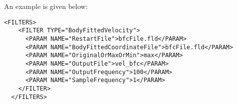 An example is given below:

\begin{lstlisting}[style=XMLStyle]
  <FILTERS>
    <FILTER TYPE="BodyFittedVelocity">
      <PARAM NAME="RestartFile">bfcFile.fld</PARAM>
      <PARAM NAME="BodyFittedCoordinateFile">bfcFile.fld</PARAM>
      <PARAM NAME="OriginalOrMaxOrMin">max</PARAM>
      <PARAM NAME="OutputFile">vel_bfc</PARAM>
      <PARAM NAME="OutputFrequency">100</PARAM>
      <PARAM NAME="SampleFrequency">1</PARAM>
    </FILTER>
  </FILTERS>
\end{lstlisting}
